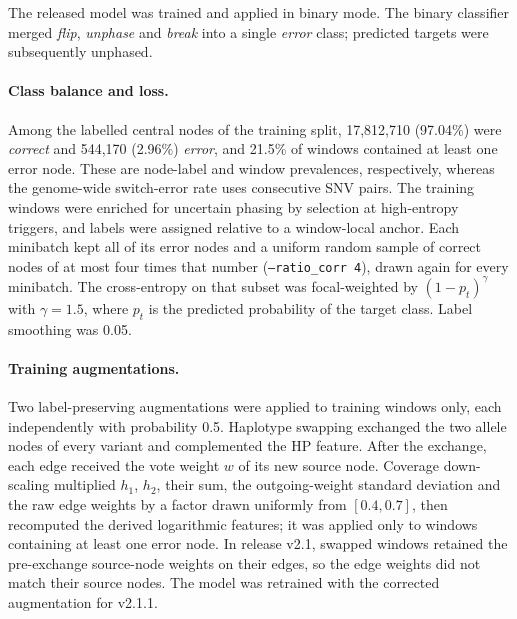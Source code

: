 \documentclass[11pt,a4paper]{article}
\newcommand{\code}[1]{\texttt{\small #1}}
\begin{document}
The released model was trained and applied in binary mode. The binary classifier merged \emph{flip}, \emph{unphase} and \emph{break} into a single \emph{error} class; predicted targets were subsequently unphased.

\paragraph{Class balance and loss.} Among the labelled central nodes of the training split, 17,812,710 (97.04\%) were \emph{correct} and 544,170 (2.96\%) \emph{error}, and 21.5\% of windows contained at least one error node. These are node-label and window prevalences, respectively, whereas the genome-wide switch-error rate uses consecutive SNV pairs. The training windows were enriched for uncertain phasing by selection at high-entropy triggers, and labels were assigned relative to a window-local anchor. Each minibatch kept all of its error nodes and a uniform random sample of correct nodes of at most four times that number (\code{--ratio\_corr 4}), drawn again for every minibatch. The cross-entropy on that subset was focal-weighted\cite{lin2017focal} by $(1-p_t)^{\gamma}$ with $\gamma = 1.5$, where $p_t$ is the predicted probability of the target class. Label smoothing was 0.05.

\paragraph{Training augmentations.} Two label-preserving augmentations were applied to training windows only, each independently with probability 0.5. Haplotype swapping exchanged the two allele nodes of every variant and complemented the HP feature. After the exchange, each edge received the vote weight $w$ of its new source node. Coverage down-scaling multiplied $h_1$, $h_2$, their sum, the outgoing-weight standard deviation and the raw edge weights by a factor drawn uniformly from $[0.4, 0.7]$, then recomputed the derived logarithmic features; it was applied only to windows containing at least one error node. In release v2.1, swapped windows retained the pre-exchange source-node weights on their edges, so the edge weights did not match their source nodes. The model was retrained with the corrected augmentation for v2.1.1.
\end{document}
